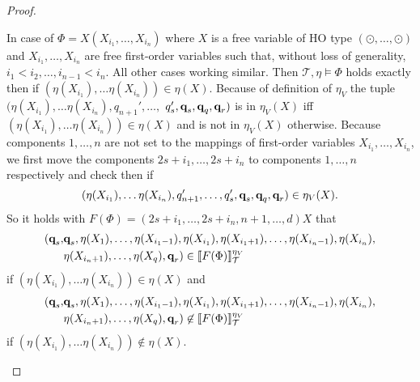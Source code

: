 \begin{proof}
\begin{compactitem}
        \item In case of $\Phi = X(X_{i_1}, \dots, X_{i_n})$ where $X$ is a free variable of HO type $(\odot, \dots,
        \odot)$ and $X_{i_1}, \dots, X_{i_n}$ are free first-order variables such that, without loss of generality, $i_1 < i_2, \dots, i_{n-1} < i_n$. All other cases working similar. Then $\mathcal{T}, \eta \models \Phi$
        holds exactly then if $(\eta(X_{i_1}), \dots \eta(X_{i_n})) \in \eta(X)$. Because of definition of $\eta_V$ the
        tuple $(\eta(X_{i_1}), \dots \eta(X_{i_n}), q_{n + 1}', \dots,$ $ q_{s}', \emph{q}_s, \emph{q}_q, \emph{q}_r)$ is in $
        \eta_V(X)$ iff $(\eta(X_{i_1}),\dots \eta(X_{i_n})) \in \eta(X)$ and is not in $\eta_V(X)$ otherwise. Because
         components $1, \dots, n$ are not set to the mappings of first-order variables $X_{i_1}, \dots, X_{i_n}$, we first move the components $2s+i_1, \dots, 2s+i_n$ to components $1, \dots, n$ respectively and check then if
        \[(\eta(X_{i_1}), \dots \eta(X_{i_n}), q_{n + 1}', \dots, q_{s}', \emph{q}_s, \emph{q}_q, \emph{q}_r) \in \eta_V(X).\]
        So it holds with $F(\Phi) = {(2s+i_1, \dots, 2s+i_n, n+1, \dots, d)}X$ that
        \begin{align*}
            (\emph{q}_s, &\emph{q}_s, \eta(X_1), \dots, \eta(X_{i_1-1}), \eta(X_{i_1}), \eta(X_{i_1+1}), \dots, \eta(X_{i_n-1}), \eta(X_{i_n}), \\&\eta(X_{i_n+1}), \dots, \eta
            (X_q), \emph{q}_r) \in \llbracket F(\Phi) \rrbracket^{\eta_V
            }_\mathcal{T}
        \end{align*}
        if $(\eta(X_{i_1}), \dots \eta(X_{i_n})) \in \eta(X)$ and
        \begin{align*}
            (\emph{q}_s, &\emph{q}_s, \eta(X_1), \dots, \eta(X_{i_1-1}), \eta(X_{i_1}), \eta(X_{i_1+1}), \dots, \eta(X_{i_n-1}), \eta(X_{i_n}), \\&\eta(X_{i_n+1}), \dots, \eta
            (X_q), \emph{q}_r) \not \in \llbracket F(\Phi) \rrbracket^{\eta_V
            }_\mathcal{T}
        \end{align*}
        if $(\eta(X_{i_1}), \dots \eta(X_{i_n})) \not\in \eta(X)$.


\end{compactitem}
\end{proof}
